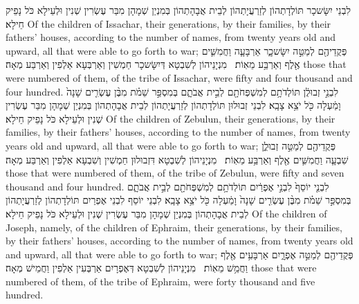 {לִבְנֵי יִשָּׂשכָר תּוֹלְדָתְהוֹן לְזַרְעֲיָתְהוֹן לְבֵית אֲבָהָתְהוֹן בְּמִנְיַן שְׁמָהָן מִבַּר עֶשְׂרִין שְׁנִין וּלְעֵילָא כֹּל נָפֵיק חֵילָא׃}
{Of the children of Issachar, their generations, by their families, by their fathers’ houses, according to the number of names, from twenty years old and upward, all that were able to go forth to war;}{}
{פְּקֻדֵיהֶ֖ם לְמַטֵּ֣ה יִשָּׂשכָ֑ר אַרְבָּעָ֧ה וַחֲמִשִּׁ֛ים אֶ֖לֶף וְאַרְבַּ֥ע מֵאֽוֹת׃ \petucha }
{מִנְיָנֵיהוֹן לְשִׁבְטָא דְּיִשָּׂשכָר חַמְשִׁין וְאַרְבְּעָא אַלְפִין וְאַרְבַּע מְאָה׃}
{those that were numbered of them, of the tribe of Issachar, were fifty and four thousand and four hundred.}{}
{לִבְנֵ֣י זְבוּלֻ֔ן תּוֹלְדֹתָ֥ם לְמִשְׁפְּחֹתָ֖ם לְבֵ֣ית אֲבֹתָ֑ם בְּמִסְפַּ֣ר שֵׁמֹ֗ת מִבֶּ֨ן עֶשְׂרִ֤ים שָׁנָה֙ וָמַ֔עְלָה כֹּ֖ל יֹצֵ֥א צָבָֽא׃}
{לִבְנֵי זְבוּלוּן תּוֹלְדָתְהוֹן לְזַרְעֲיָתְהוֹן לְבֵית אֲבָהָתְהוֹן בְּמִנְיַן שְׁמָהָן מִבַּר עֶשְׂרִין שְׁנִין וּלְעֵילָא כֹּל נָפֵיק חֵילָא׃}
{Of the children of Zebulun, their generations, by their families, by their fathers’ houses, according to the number of names, from twenty years old and upward, all that were able to go forth to war;}{}
{פְּקֻדֵיהֶ֖ם לְמַטֵּ֣ה זְבוּלֻ֑ן שִׁבְעָ֧ה וַחֲמִשִּׁ֛ים אֶ֖לֶף וְאַרְבַּ֥ע מֵאֽוֹת׃ \petucha }
{מִנְיָנֵיהוֹן לְשִׁבְטָא דִּזְבוּלוּן חַמְשִׁין וְשִׁבְעָא אַלְפִין וְאַרְבַּע מְאָה׃}
{those that were numbered of them, of the tribe of Zebulun, were fifty and seven thousand and four hundred.}{}
{לִבְנֵ֤י יוֹסֵף֙ לִבְנֵ֣י אֶפְרַ֔יִם תּוֹלְדֹתָ֥ם לְמִשְׁפְּחֹתָ֖ם לְבֵ֣ית אֲבֹתָ֑ם בְּמִסְפַּ֣ר שֵׁמֹ֗ת מִבֶּ֨ן עֶשְׂרִ֤ים שָׁנָה֙ וָמַ֔עְלָה כֹּ֖ל יֹצֵ֥א צָבָֽא׃}
{לִבְנֵי יוֹסֵף לִבְנֵי אֶפְרַיִם תּוֹלְדָתְהוֹן לְזַרְעֲיָתְהוֹן לְבֵית אֲבָהָתְהוֹן בְּמִנְיַן שְׁמָהָן מִבַּר עֶשְׂרִין שְׁנִין וּלְעֵילָא כֹּל נָפֵיק חֵילָא׃}
{Of the children of Joseph, namely, of the children of Ephraim, their generations, by their families, by their fathers’ houses, according to the number of names, from twenty years old and upward, all that were able to go forth to war;}{}
{פְּקֻדֵיהֶ֖ם לְמַטֵּ֣ה אֶפְרָ֑יִם אַרְבָּעִ֥ים אֶ֖לֶף וַחֲמֵ֥שׁ מֵאֽוֹת׃ \petucha }
{מִנְיָנֵיהוֹן לְשִׁבְטָא דְּאֶפְרָיִם אַרְבְּעִין אַלְפִין וַחֲמֵישׁ מְאָה׃}
{those that were numbered of them, of the tribe of Ephraim, were forty thousand and five hundred.}{}
